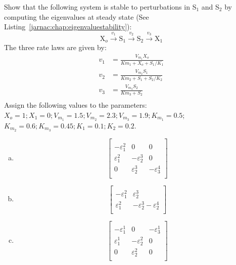 \documentclass[12pt]{article}
\begin{document}
\begin{question}
Show that the following system is stable to perturbations in S$_1$ and S$_2$ by computing the eigenvalues at steady state (See Listing~\ref{jarnac:chap:eigenvaluestability}):
%
$$ \text{X}_o \stackrel{v_1}{\rightarrow} \text{S}_1 \stackrel{v_2}{\rightarrow} \text{S}_2 \stackrel{v_3}{\rightarrow} \text{X}_1 $$
%
The three rate laws are given by:
%
\begin{align*}
v_1 &= \frac{V_{m_1} X_o}{Km_1 + X_o + S_1/K_1} \\[5pt]
v_2 &= \frac{V_{m_2} S_1}{Km_2 + S_1 + S_2/K_2} \\[5pt]
v_3 &= \frac{V_{m_3} S_2}{Km_3 + S_2} \\[5pt]
\end{align*}
%
Assign the following values to the parameters: $X_o = 1; X_1 = 0; V_{m_1} = 1.5; V_{m_2} = 2.3; V_{m_3} = 1.9; K_{m_1} = 0.5$; $K_{m_2} = 0.6; K_{m_3} = 0.45; K_1 = 0.1; K_2 = 0.2$.
\end{question}
\begin{solution}
\begin{enumerate}[a)]
\item $$
\begin{bmatrix}\\[-8pt]
-\varepsilon^2_1 & 0 & 0 \\[7pt]
\varepsilon^2_1 & -\varepsilon^3_2 & 0 \\[7pt]
0 & \varepsilon^3_2 & -\varepsilon^4_3  \\
\end{bmatrix}
$$
\item
$$
\begin{bmatrix}\\[-8pt]
-\varepsilon^2_1 & \varepsilon^3_2  \\[7pt]
\varepsilon^2_1 & -\varepsilon^3_2 -\varepsilon^4_2 \\
\end{bmatrix}
$$
\item
$$
\begin{bmatrix}\\[-8pt]
-\varepsilon^1_1 & 0 & -\varepsilon^1_3 \\[7pt]
\varepsilon^1_1 & -\varepsilon^2_2 & 0 \\[7pt]
0 & \varepsilon^2_2 & 0 \\
\end{bmatrix}
$$
\end{enumerate}
\end{solution}
\end{document}
